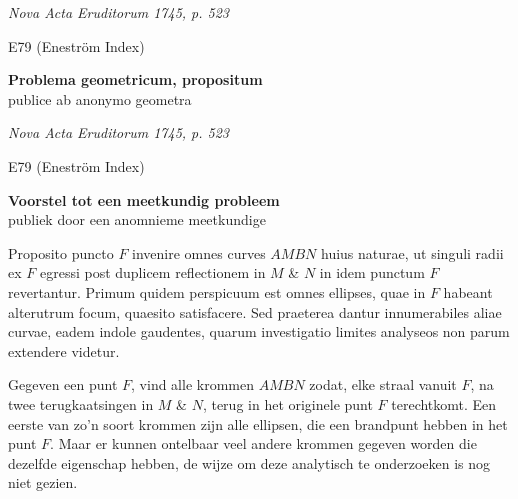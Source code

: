 \documentclass[10pt,a4paper]{article}
\begin{document}
	
	\begin{paracol}{2}
	\par \textit{Nova Acta Eruditorum 1745, p. 523}
	\par E79 (Eneström Index) 
	\begin{center}
		\par {}
		
		\par {\bf Problema geometricum, propositum}\\
		publice ab anonymo geometra
	\end{center}
	\switchcolumn
	\par \textit{Nova Acta Eruditorum 1745, p. 523}
	\par E79 (Eneström Index) 
	\begin{center}
		\par {}
		
		\par {\bf Voorstel tot een meetkundig probleem}\\
		publiek door een anomnieme meetkundige
	\end{center}
	\switchcolumn*
	
	
	\par Proposito puncto $F$ invenire omnes curves $AMBN$ huius naturae, ut singuli radii ex $F$ egressi post duplicem reflectionem in $M$ \& $N$ in idem punctum $F$ revertantur.  Primum quidem perspicuum est omnes ellipses, quae in $F$ habeant alterutrum focum, quaesito satisfacere.  Sed praeterea dantur innumerabiles aliae curvae, eadem indole gaudentes, quarum investigatio limites analyseos non parum extendere videtur.
		
	\switchcolumn
	\par Gegeven een punt $F$, vind alle krommen $AMBN$ zodat, elke straal vanuit $F$, na twee terugkaatsingen in $M$ \& $N$, terug in het originele punt $F$ terechtkomt. Een eerste van zo'n soort krommen zijn alle ellipsen, die een brandpunt hebben in het punt $F$. Maar er kunnen ontelbaar veel andere krommen gegeven worden die dezelfde eigenschap hebben, de wijze om deze analytisch te onderzoeken is nog niet gezien.

	\switchcolumn*
			

\end{paracol}
\end{document}
